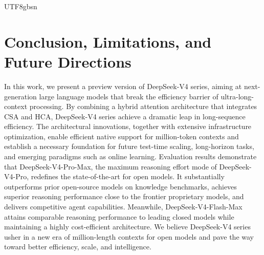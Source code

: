 \documentclass[11pt, a4paper, logo, copyright, nonumbering]{deepseek}
\newcommand{\dsviv}{DeepSeek-V4}
\newcommand{\dsvivp}{DeepSeek-V4-Pro}
\newcommand{\dsvivpm}{DeepSeek-V4-Pro-Max}
\newcommand{\dsvivfm}{DeepSeek-V4-Flash-Max}
\newcommand{\hca}{HCA}
\newcommand{\csa}{CSA}
\begin{document}
\begin{CJK*}{UTF8}{gbsn}
\section{Conclusion, Limitations, and Future Directions}
\label{sec:conclusion}

In this work, we present a preview version of \dsviv{} series, aiming at next-generation large language models that break the efficiency barrier of ultra-long-context processing. 
By combining a hybrid attention architecture that integrates \csa{} and \hca{}, \dsviv{} series achieve a dramatic leap in long-sequence efficiency. 
The architectural innovations, together with extensive infrastructure optimization, enable efficient native support for million-token contexts and establish a necessary foundation for future test-time scaling, long-horizon tasks, and emerging paradigms such as online learning.
Evaluation results demonstrate that \dsvivpm{}, the maximum reasoning effort mode of \dsvivp{}, redefines the state-of-the-art for open models. 
It substantially outperforms prior open-source models on knowledge benchmarks, achieves superior reasoning performance close to the frontier proprietary models, and delivers competitive agent capabilities. 
Meanwhile, \dsvivfm{} attains comparable reasoning performance to leading closed models while maintaining a highly cost-efficient architecture. 
We believe \dsviv{} series usher in a new era of million-length contexts for open models and pave the way toward better efficiency, scale, and intelligence.


\end{CJK*}
\end{document}

